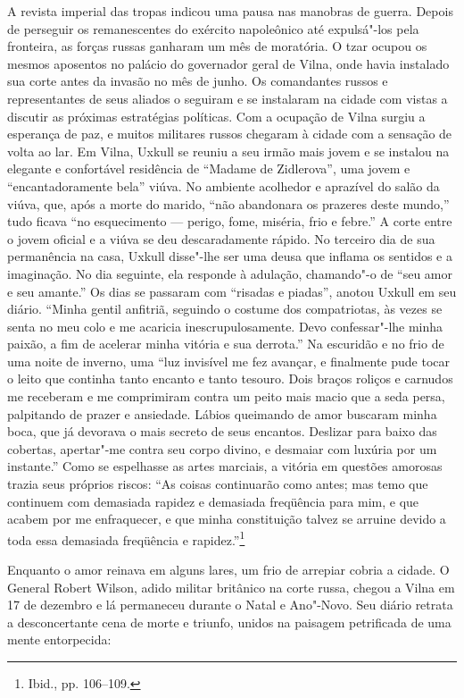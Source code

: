 A revista imperial das tropas indicou uma pausa nas manobras de guerra.
Depois de perseguir os remanescentes do exército napoleônico até
expulsá"-los pela fronteira, as forças russas ganharam um mês de
moratória. O tzar ocupou os mesmos aposentos no palácio do governador
geral de Vilna, onde havia instalado sua corte antes da invasão no mês
de junho. Os comandantes russos e representantes de seus aliados o
seguiram e se instalaram na cidade com vistas a discutir as próximas
estratégias políticas. Com a ocupação de Vilna surgiu a esperança de
paz, e muitos militares russos chegaram à cidade com a sensação de volta
ao lar. Em Vilna, Uxkull se reuniu a seu irmão mais jovem e se instalou
na elegante e confortável residência de ``Madame de Zidlerova'', uma
jovem e ``encantadoramente bela'' viúva. No ambiente acolhedor e
aprazível do salão da viúva, que, após a morte do marido, ``não
abandonara os prazeres deste mundo,'' tudo ficava ``no esquecimento ---
perigo, fome, miséria, frio e febre.'' A corte entre o jovem oficial e a
viúva se deu descaradamente rápido. No terceiro dia de sua permanência
na casa, Uxkull disse"-lhe ser uma deusa que inflama os sentidos e a
imaginação. No dia seguinte, ela responde à adulação, chamando"-o de
``seu amor e seu amante.'' Os dias se passaram com ``risadas e piadas'',
anotou Uxkull em seu diário. ``Minha gentil anfitriã, seguindo o costume
dos compatriotas, às vezes se senta no meu colo e me acaricia
inescrupulosamente. Devo confessar"-lhe minha paixão, a fim de acelerar
minha vitória e sua derrota.'' Na escuridão e no frio de uma noite de
inverno, uma ``luz invisível me fez avançar, e finalmente pude tocar o
leito que continha tanto encanto e tanto tesouro. Dois braços roliços e
carnudos me receberam e me comprimiram contra um peito mais macio que a
seda persa, palpitando de prazer e ansiedade. Lábios queimando de amor
buscaram minha boca, que já devorava o mais secreto de seus encantos.
Deslizar para baixo das cobertas, apertar"-me contra seu corpo divino, e
desmaiar com luxúria por um instante.'' Como se espelhasse as artes
marciais, a vitória em questões amorosas trazia seus próprios riscos:
``As coisas continuarão como antes; mas temo que continuem com demasiada
rapidez e demasiada freqüência para mim, e que acabem por me
enfraquecer, e que minha constituição talvez se arruine devido a toda
essa demasiada freqüência e rapidez.''\footnote{Ibid., pp. 106--109.}

Enquanto o amor reinava em alguns lares, um frio de arrepiar cobria a
cidade. O General Robert Wilson, adido militar britânico na corte russa,
chegou a Vilna em 17 de dezembro e lá permaneceu durante o Natal e
Ano"-Novo. Seu diário retrata a desconcertante cena de morte e triunfo,
unidos na paisagem petrificada de uma mente entorpecida:

